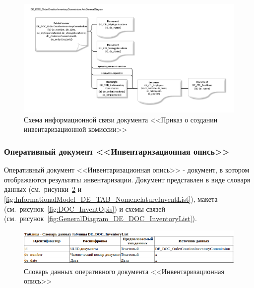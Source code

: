 \begin{figure}[!h]
    \centering
    \includegraphics[width=18cm]
        {assets/ARIS/GeneralDiagram/DE_DOC_OrderCreationImventoryCommission.ArisGeneralDiagram.pdf}
    \caption{Схема информационной связи документа <<Приказ о создании инвентаризационной комиссии>>}
    \label{fig:GeneralDiagram_DE_DOC_OrderCreationImventoryCommission}
\end{figure}

\newpage

\subsubsection{Оперативный документ <<Инвентаризационная опись>>}

Оперативный документ <<Инвентаризационная опись>>
- документ, в котором отображаются результаты инвентаризации.
Документ представлен в виде словаря данных (см.~рисунки~\ref{fig:InformationalModel_DE_DOC_InventoryList} и \ref{fig:InformationalModel_DE_TAB_NomenclatureInventList}),
макета (см.~рисунок~\ref{fig:DOC_InventOpis})
и схемы связей (см.~рисунок~\ref{fig:GeneralDiagram_DE_DOC_InventoryList}).

\begin{figure}[!h]
    \centering
    \includegraphics[width=14cm]
    {assets/InformationalModel/DE_DOC_InventoryList.png}
    \caption{Словарь данных оперативного документа <<Инвентаризационная опись>>}
    \label{fig:InformationalModel_DE_DOC_InventoryList}
\end{figure}

